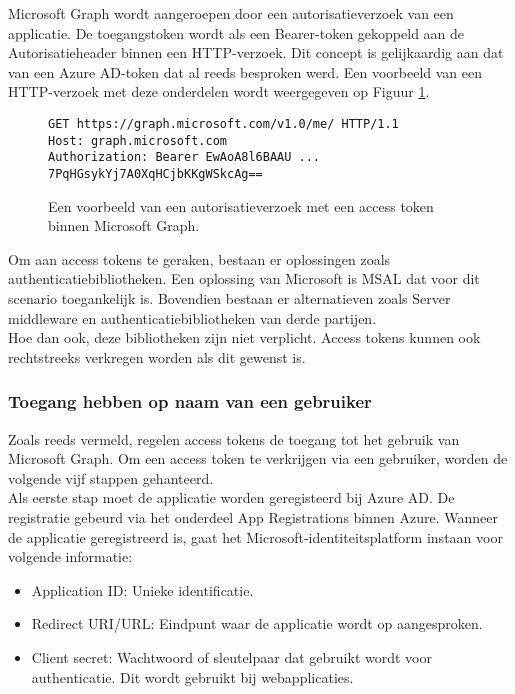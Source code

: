 Microsoft Graph wordt aangeroepen door een autorisatieverzoek van een applicatie. De toegangstoken wordt als een Bearer-token gekoppeld aan de Autorisatieheader binnen een \ac{HTTP}-verzoek. Dit concept is gelijkaardig aan dat van een Azure \ac{AD}-token dat al reeds besproken werd. Een voorbeeld van een \ac{HTTP}-verzoek met deze onderdelen wordt weergegeven op Figuur \ref{MSGA}. \\

\begin{figure}[h]
    \footnotesize\begin{verbatim}GET https://graph.microsoft.com/v1.0/me/ HTTP/1.1
Host: graph.microsoft.com
Authorization: Bearer EwAoA8l6BAAU ... 7PqHGsykYj7A0XqHCjbKKgWSkcAg==
    \end{verbatim}    
    \caption[Voorbeeld Microsoft Graph Autorisatieverzoek]{Een voorbeeld van een autorisatieverzoek met een access token binnen Microsoft Graph.}
    \label{MSGA}
\end{figure}

Om aan access tokens te geraken, bestaan er oplossingen zoals authenticatiebibliotheken. Een oplossing van Microsoft is \ac{MSAL} dat voor dit scenario toegankelijk is. Bovendien bestaan er alternatieven zoals Server middleware en authenticatiebibliotheken van derde partijen. \\

Hoe dan ook, deze bibliotheken zijn niet verplicht. Access tokens kunnen ook rechtstreeks verkregen worden als dit gewenst is. 

\subsubsection{Toegang hebben op naam van een gebruiker}

Zoals reeds vermeld, regelen access tokens de toegang tot het gebruik van Microsoft Graph. Om een access token te verkrijgen via een gebruiker, worden de volgende vijf stappen gehanteerd. \\

Als eerste stap moet de applicatie worden geregisteerd bij Azure \ac{AD}. De registratie gebeurd via het onderdeel App Registrations binnen Azure. Wanneer de applicatie geregistreerd is, gaat het Microsoft-identiteitsplatform instaan voor volgende informatie: 

\begin{itemize}
    \item Application ID: Unieke identificatie.
    \item Redirect URI/URL: Eindpunt waar de applicatie wordt op aangesproken.
    \item Client secret: Wachtwoord of sleutelpaar dat gebruikt wordt voor authenticatie. Dit wordt gebruikt bij webapplicaties.
\end{itemize}

